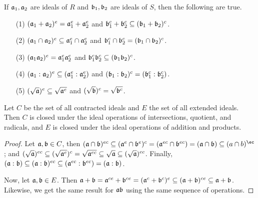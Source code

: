 \begin{proposition}\label{proposition_5.6.5}
    If $\af_1,\af_2$ are ideals of $R$ and  $\bf_1,\bf_2$ are ideals of $S$,
    then the following are true.
    \begin{enumerate}
        \item[(1)] $(\af_1+\af_2)^e=\af_1^e+\af_2^e$ and $\bf_1^c+\bf_2^c
            \subseteq (\bf_1+\bf_2)^c$.

        \item[(2)] $(\af_1 \cap \af_2)^e \subseteq \af_1^e \cap \af_2^e$ and
            $\bf_1^c \cap \bf_2^c=(\bf_1 \cap \bf_2)^c$.

        \item[(3)] $(\af_1\af_2)^e=\af_1^e\af_2^e$ and $\bf_1^c\bf_2^c
            \subseteq (\bf_1\bf_2)^c$.

        \item[(4)] $(\af_1:\af_2)^e \subseteq (\af_1^e:\af_2^e)$ and
            $(\bf_1:\bf_2)^c=(\bf_1^c:\bf_2^c)$.

        \item[(5)] $(\sqrt{\af})^e \subseteq \sqrt{\af^e}$ and
            $(\sqrt{\bf})^c=\sqrt{\bf^c}$.
    \end{enumerate}
\end{proposition}
\begin{corollary}
  Let $C$ be the set of all contracted ideals and $E$ the set of all extended
  ideals. Then $C$ is closed under the ideal operations of intersections,
  quotient, and radicals, and  $E$ is closed under the ideal operations of
  addition and products.
\end{corollary}
\begin{proof}
  Let $\af,\bf \in C$, then $(\af \cap \bf)^{ec} \subseteq (\af^e \cap
  \bf^e)^c=(\af^{ec} \cap \bf^{ec})=(\af \cap \bf) \subseteq (a \cap b)^{\ec}$;
  and $(\sqrt{\af})^{ec} \subseteq (\sqrt{\af^e})^c=\sqrt{\af^{ec}} \subseteq
  \sqrt{\af} \subseteq (\sqrt{\af})^{ec}$. Finally, $(\af:\bf) \subseteq
  (\af:\bf)^{ec} \subseteq (\af^{ec}:\bf^{ec})=(\af:\bf)$.

  Now, let $\af, \bf \in E$. Then $\af+\bf=\af^{ce}+\bf^{ce}=(\af^c+\bf^c)^e
  \subseteq (\af+\bf)^{ce} \subseteq \af+\bf$. Likewise, we get the same result
  for $\af\bf$ using the same sequence of operations.
\end{proof}
